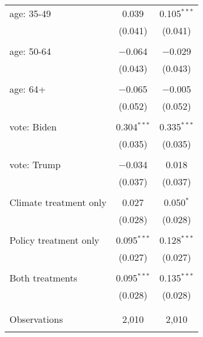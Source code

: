 \begin{tabular}{@{\extracolsep{5pt}}lcc}
 age: 35-49 & 0.039 & 0.105$^{***}$ \\ 
  & (0.041) & (0.041) \\ 
  & & \\ 
 age: 50-64 & $-$0.064 & $-$0.029 \\ 
  & (0.043) & (0.043) \\ 
  & & \\ 
 age: 64+ & $-$0.065 & $-$0.005 \\ 
  & (0.052) & (0.052) \\ 
  & & \\ 
 vote: Biden & 0.304$^{***}$ & 0.335$^{***}$ \\ 
  & (0.035) & (0.035) \\ 
  & & \\ 
 vote: Trump & $-$0.034 & 0.018 \\ 
  & (0.037) & (0.037) \\ 
  & & \\ 
 Climate treatment only & 0.027 & 0.050$^{*}$ \\ 
  & (0.028) & (0.028) \\ 
  & & \\ 
 Policy treatment only & 0.095$^{***}$ & 0.128$^{***}$ \\ 
  & (0.027) & (0.027) \\ 
  & & \\ 
 Both treatments & 0.095$^{***}$ & 0.135$^{***}$ \\ 
  & (0.028) & (0.028) \\ 
  & & \\ 
\hline \\[-1.8ex] 

Observations & 2,010 & 2,010 \\ 
\hline 
\hline \\[-1.8ex] 
\end{tabular} 